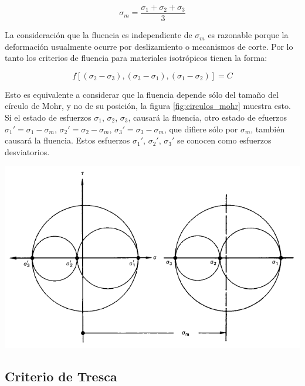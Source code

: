 \begin{equation}
\sigma_m=\frac{\sigma_1+\sigma_2+\sigma_3}{3}
\end{equation}

La consideración que la fluencia es independiente de $\sigma_m$ es razonable porque la deformación 
usualmente ocurre por deslizamiento o mecanismos de corte. Por lo tanto los criterios de fluencia 
para materiales isotrópicos tienen la forma: ~\cite{hosford2007}

\begin{equation}
f[(\sigma_2-\sigma_3 ),(\sigma_3-\sigma_1 ),(\sigma_1-\sigma_2 )] = C
\end{equation}

Esto es equivalente a considerar que la fluencia depende sólo del tamaño del círculo de Mohr, 
y no de su posición, la figura \ref{fig:circulos_mohr} muestra esto. Si el estado de esfuerzos 
$\sigma_1$, $\sigma_2$, $\sigma_3$, causará la fluencia, otro estado de efuerzos 
$\sigma_1' = \sigma_1 - \sigma_m $, $\sigma_2' = \sigma_2 - \sigma_m $, $\sigma_3' = \sigma_3 - \sigma_m $, 
que difiere sólo por $\sigma_m$, también causará la fluencia. Estos esfuerzos $\sigma_1'$, $\sigma_2'$, 
$\sigma_3'$ se conocen como esfuerzos desviatorios. ~\cite{hosford2007}

\begin{center}
\includegraphics[scale=0.75]{src/ch2/circulos_mohr.png}
\label{fig:circulos_mohr}
\end{center}


\subsection{Criterio de Tresca}

